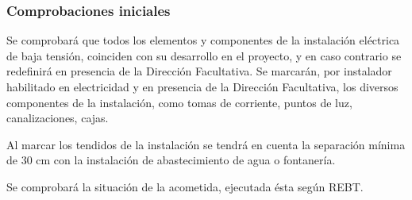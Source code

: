\documentclass[../main.tex]{subfiles}
\begin{document}
\subsubsection{Comprobaciones iniciales}
Se comprobará que todos los elementos y componentes de la instalación eléctrica de baja tensión, coinciden con su desarrollo en el proyecto, y en caso contrario se redefinirá en presencia de la Dirección Facultativa. Se marcarán, por instalador habilitado en electricidad y en presencia de la Dirección Facultativa, los diversos componentes de la instalación, como tomas de corriente, puntos de luz, canalizaciones, cajas. \par
\vspace{0.5 cm}
Al marcar los tendidos de la instalación se tendrá en cuenta la separación mínima de 30 cm con la instalación de abastecimiento de agua o fontanería. \par
\vspace{0.5 cm}
Se comprobará la situación de la acometida, ejecutada ésta según REBT.
\end{document}
